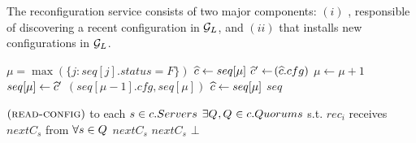 The  reconfiguration service consists of two major components: 
$(i)$ , responsible of discovering a  recent configuration in ${\mathcal{G}_L}$, and 
$(ii)$   that installs new configurations in ${\mathcal{G}_L}$.  

\begin{algorithm*}[!ht]
	\begin{algorithmic}[2]
		\begin{multicols}{2}	{\small
				\State $\mu = \max(\{j: seq[j].status = F\})$	\label{line:readconfig:final}
				\State $\widehat{c} \gets seq[\mu]$ %
				\State $ \widehat{c}' \gets$$(\widehat{c}.cfg)$ 
				\State $\mu\gets \mu+1$				\label{line:readconfig:increment}
				\State $seq[\mu] \gets \widehat{c}'$	\label{line:readconfig:assign}
				\State {}$(seq[\mu-1].cfg, seq[\mu])$ 	\label{line:readconfig:put}
				\State $\widehat{c} \gets seq[\mu]$ \label{line:newconfig:assign}
				\EndIf
				\EndWhile
				 $seq$
				\EndProcedure
				
				\Statex
				
				 $(\text{{\sc read-config}})$ to each $s\in c.Servers$
				 $\exists Q_{},  Q_{}\in c.Quorums$ s.t. $rec_i$ receives $nextC_s$ from $\forall s\in Q_{}$
					 $nextC_s$
						 $nextC_s$
					\Else
						 $\bot$
				\EndIf 
				\EndProcedure
				
}
\end{multicols}
\end{algorithmic}
\end{algorithm*}
